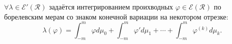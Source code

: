 \begin{to_thr}
	$\forall \lambda \in \mathcal{E}'(\mathcal{R})$ задаётся интегрированием проихводных $\varphi\in \mathcal{E}(\mathcal{R})$ по борелевским мерам со знаком конечной вариации на некотором отрезке:
	\begin{equation*}
		\lambda(\varphi) = \int_{-m}^{m} \varphi d \mu_0 + \int_{-m}^{m} \varphi' d \mu_1 + \cdots + \int_{-m}^{m}\varphi^{(k)} d \mu_k.
	\end{equation*}
\end{to_thr}